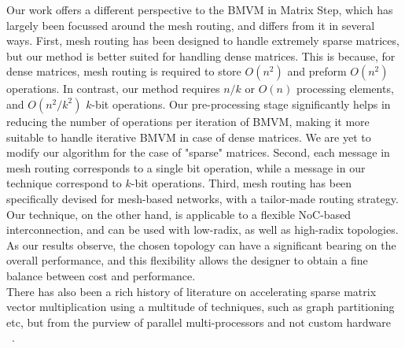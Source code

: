 \documentclass[conference, 9pt]{IEEEtran}
\begin{document}
Our work offers a different perspective to the BMVM in Matrix Step, which has 
largely been focussed around the mesh routing, and differs from it in several 
ways. First, mesh routing has been designed to handle extremely sparse matrices, 
but our method is better suited for handling dense matrices. This is because, 
for dense matrices, mesh routing is required to store $O(n^2)$ and preform 
$O(n^2)$ operations. In contrast, our method requires $n/k$ or $O(n)$ processing 
elements, and $O(n^2/k^2)$ $k$-bit operations. Our pre-processing stage 
significantly helps in reducing the number of operations per iteration of BMVM, 
making it more suitable to handle iterative BMVM in case of dense matrices. We 
are yet to modify our algorithm for the case of "sparse" matrices. Second, each 
message in mesh routing corresponds to a single bit operation, while a message 
in our technique correspond to $k$-bit operations. Third, mesh routing has been 
specifically devised for mesh-based networks, with a tailor-made routing 
strategy. 
Our technique, on the other hand, is applicable to a flexible NoC-based 
interconnection, and can be used with low-radix, as well as high-radix 
topologies. As our results observe, the chosen topology can have a significant 
bearing on the overall performance, and this flexibility allows the designer to 
obtain a fine balance between cost and performance. \\

There has also been a rich history of literature on accelerating sparse matrix 
vector multiplication using a multitude of techniques, such as graph 
partitioning etc, but from the purview of parallel multi-processors and not 
custom hardware ~\cite{ccatalyurek1996decomposing, toledo1997improving}. 
\end{document}
